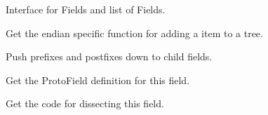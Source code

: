 \documentclass[A4paper,10pt,english]{sphinxmanual}
\begin{document}
\begin{fulllineitems}
\label{devel/code:field.BaseField}
Interface for Fields and list of Fields.

\begin{fulllineitems}
\label{devel/code:field.BaseField.add_var}
Get the endian specific function for adding a item to a tree.

\end{fulllineitems}


\begin{fulllineitems}
\label{devel/code:field.BaseField.push_modifiers}
Push prefixes and postfixes down to child fields.

\end{fulllineitems}


\begin{fulllineitems}
\label{devel/code:field.BaseField.get_definition}
Get the ProtoField definition for this field.

\end{fulllineitems}


\begin{fulllineitems}
\label{devel/code:field.BaseField.get_code}
Get the code for dissecting this field.

\end{fulllineitems}


\end{fulllineitems}

\end{document}
